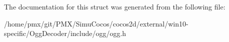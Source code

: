 The documentation for this struct was generated from the following file\+:\begin{DoxyCompactItemize}
\item 
/home/pmx/git/\+P\+M\+X/\+Simu\+Cocos/cocos2d/external/win10-\/specific/\+Ogg\+Decoder/include/ogg/ogg.\+h\end{DoxyCompactItemize}
